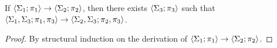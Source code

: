 

\begin{lemma}\label{lem:par}
If $\left<\Sigma_1;\pi_1\right> -> \left<\Sigma_2;\pi_2\right>$,
then there exists $\left<\Sigma_3;\pi_3\right>$ such that
$\left<\Sigma_1,\Sigma_3;\pi_1, \pi_3\right> ->
\left<\Sigma_2,\Sigma_3;\pi_2,\pi_3\right>$.
\begin{proof}
  By structural induction on the derivation of
  $\left<\Sigma_1;\pi_1\right> -> \left<\Sigma_2;\pi_2\right>$.
\end{proof}
\end{lemma}


